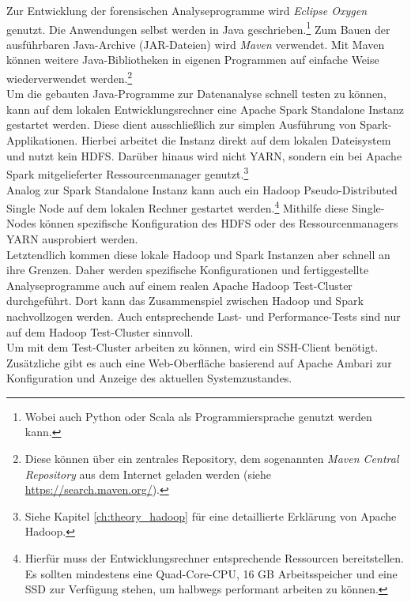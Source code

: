 \noindent
Zur Entwicklung der forensischen Analyseprogramme wird \textit{Eclipse Oxygen} genutzt. Die Anwendungen selbst werden in Java geschrieben.\footnote{Wobei auch Python oder Scala als Programmiersprache genutzt werden kann.} Zum Bauen der ausführbaren Java-Archive (JAR-Dateien) wird \textit{Maven} verwendet. Mit Maven können weitere Java-Bibliotheken 
in eigenen Programmen auf einfache Weise wiederverwendet werden.\footnote{Diese können über ein zentrales Repository, dem sogenannten \textit{Maven Central Repository} aus dem Internet geladen werden (siehe \url{https://search.maven.org/}).}\\
Um die gebauten Java-Programme zur Datenanalyse schnell testen zu können, kann auf dem lokalen Entwicklungsrechner eine Apache Spark Standalone Instanz gestartet werden. Diese dient ausschließlich zur simplen Ausführung von Spark-Applikationen. Hierbei arbeitet die Instanz direkt auf dem lokalen Dateisystem und nutzt kein HDFS. Darüber hinaus wird nicht YARN, sondern ein bei Apache Spark mitgelieferter Ressourcenmanager genutzt.\footnote{Siehe Kapitel \ref{ch:theory_hadoop} für eine detaillierte Erklärung von Apache Hadoop.}\\

\noindent
Analog zur Spark Standalone Instanz kann auch ein Hadoop Pseudo-Distributed Single Node auf dem lokalen Rechner gestartet werden.\footnote{Hierfür muss der Entwicklungsrechner entsprechende Ressourcen bereitstellen. Es sollten mindestens eine Quad-Core-CPU, 16 GB Arbeitsspeicher und eine SSD zur Verfügung stehen, um halbwegs performant arbeiten zu können.} Mithilfe diese Single-Nodes können spezifische Konfiguration des HDFS oder des Ressourcenmanagers YARN ausprobiert werden.\\
Letztendlich kommen diese lokale Hadoop und Spark Instanzen aber schnell an ihre Grenzen. Daher werden spezifische Konfigurationen und fertiggestellte Analyseprogramme auch auf einem realen
Apache Hadoop Test-Cluster durchgeführt. Dort kann das Zusammenspiel zwischen Hadoop und Spark nachvollzogen werden. Auch entsprechende Last- und Performance-Tests sind nur auf dem Hadoop Test-Cluster sinnvoll.\\
Um mit dem Test-Cluster arbeiten zu können, wird ein SSH-Client benötigt. Zusätzliche gibt es auch eine Web-Oberfläche basierend auf Apache Ambari zur Konfiguration und Anzeige des aktuellen Systemzustandes.\\

